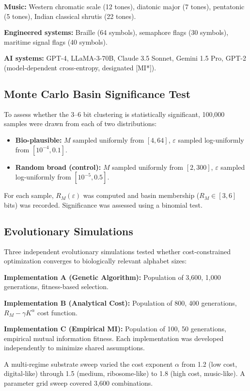 \documentclass[11pt]{article}
\begin{document}
\textbf{Music:} Western chromatic scale (12 tones), diatonic major (7 tones), pentatonic (5 tones), Indian classical shrutis (22 tones).

\textbf{Engineered systems:} Braille (64 symbols), semaphore flags (30 symbols), maritime signal flags (40 symbols).

\textbf{AI systems:} GPT-4, LLaMA-3-70B, Claude 3.5 Sonnet, Gemini 1.5 Pro, GPT-2 (model-dependent cross-entropy, designated [MI*]).

\subsection{Monte Carlo Basin Significance Test}

To assess whether the 3--6 bit clustering is statistically significant, 100,000 samples were drawn from each of two distributions:
\begin{itemize}
    \item \textbf{Bio-plausible:} $M$ sampled uniformly from $[4, 64]$, $\varepsilon$ sampled log-uniformly from $[10^{-4}, 0.1]$.
    \item \textbf{Random broad (control):} $M$ sampled uniformly from $[2, 300]$, $\varepsilon$ sampled log-uniformly from $[10^{-5}, 0.5]$.
\end{itemize}

For each sample, $R_M(\varepsilon)$ was computed and basin membership ($R_M \in [3, 6]$ bits) was recorded. Significance was assessed using a binomial test.

\subsection{Evolutionary Simulations}

Three independent evolutionary simulations tested whether cost-constrained optimization converges to biologically relevant alphabet sizes:

\textbf{Implementation A (Genetic Algorithm):} Population of 3,600, 1,000 generations, fitness-based selection.

\textbf{Implementation B (Analytical Cost):} Population of 800, 400 generations, $R_M - \gamma K^\alpha$ cost function.

\textbf{Implementation C (Empirical MI):} Population of 100, 50 generations, empirical mutual information fitness. Each implementation was developed independently to minimize shared assumptions.

A multi-regime substrate sweep varied the cost exponent $\alpha$ from 1.2 (low cost, digital-like) through 1.5 (medium, ribosome-like) to 1.8 (high cost, music-like). A parameter grid sweep covered 3,600 combinations.
\end{document}
